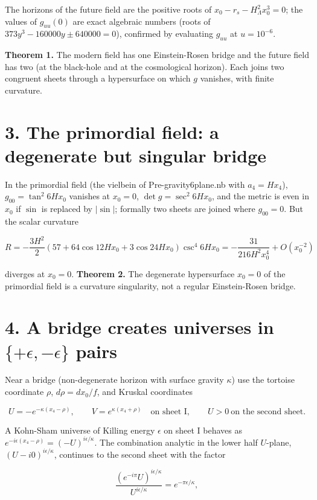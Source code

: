 \documentclass[10pt]{article}
\makeatletter
\newcommand\keepnext{\par\nopagebreak\@nobreaktrue\everypar{\@nobreakfalse\everypar{}}}
\makeatother
\begin{document}
The horizons of the future field are the positive roots of $x_0 - r_s - H_\Lambda^2x_0^3 = 0$; the values of $g_{uu}(0)$ are exact algebraic numbers (roots of $373y^3 - 160000y \pm 640000 = 0$), confirmed by evaluating $g_{uu}$ at $u = 10^{-6}$.


\textbf{Theorem 1.} The modern field has one Einstein-Rosen bridge and the future field has two (at the black-hole and at the cosmological horizon). Each joins two congruent sheets through a hypersurface on which $g$ vanishes, with finite curvature.


\section*{3. The primordial field: a degenerate but singular bridge}

In the primordial field (the vielbein of Pre-gravity6plane.nb with $a_4 = Hx_4$), $g_{00} = \tan^2 6Hx_0$ vanishes at $x_0 = 0$, $\det g = \sec^2 6Hx_0$, and the metric is even in $x_0$ if $\sin$ is replaced by $\lvert\sin\rvert$; formally two sheets are joined where $g_{00} = 0$. But the scalar curvature\keepnext


\[
R = -\frac{3H^2}{2}\left(57 + 64\cos 12Hx_0 + 3\cos 24Hx_0\right)\csc^4 6Hx_0 = -\frac{31}{216H^2x_0^4} + O(x_0^{-2})
\]

diverges at $x_0 = 0$. \textbf{Theorem 2.} The degenerate hypersurface $x_0 = 0$ of the primordial field is a curvature singularity, not a regular Einstein-Rosen bridge.


\section*{4. A bridge creates universes in $\{+\epsilon, -\epsilon\}$ pairs}

Near a bridge (non-degenerate horizon with surface gravity $\kappa$) use the tortoise coordinate $\rho$, $d\rho = dx_0/f$, and Kruskal coordinates\keepnext


\[
U = -e^{-\kappa(x_4 - \rho)},\qquad V = e^{\kappa(x_4+\rho)}\quad\text{on sheet I},\qquad U > 0\ \text{on the second sheet}.
\]

A Kohn-Sham universe of Killing energy $\epsilon$ on sheet I behaves as $e^{-i\epsilon(x_4-\rho)} = (-U)^{i\epsilon/\kappa}$. The combination analytic in the lower half $U$-plane, $(U - i0)^{i\epsilon/\kappa}$, continues to the second sheet with the factor\keepnext


\[
\frac{(e^{-i\pi}U)^{i\epsilon/\kappa}}{U^{i\epsilon/\kappa}} = e^{-\pi\epsilon/\kappa},
\]
\end{document}
